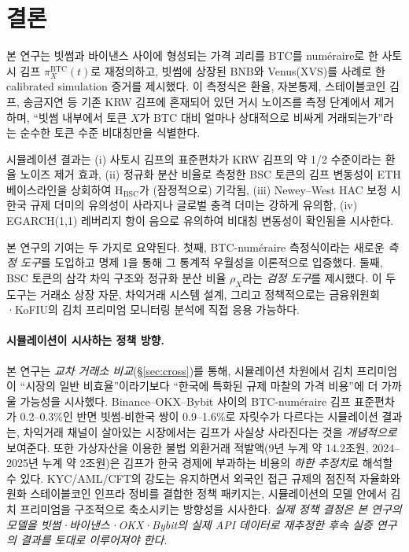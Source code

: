 \documentclass[11pt,a4paper]{article}
\begin{document}
\section{결론}

본 연구는 빗썸과 바이낸스 사이에 형성되는 가격 괴리를 BTC를 num\'eraire로 한 사토시 김프
$\pi^{\text{BTC}}_X(t)$로 재정의하고, 빗썸에 상장된 BNB와 Venus(XVS)를 사례로 한 calibrated
simulation 증거를 제시했다. 이 측정식은 환율, 자본통제, 스테이블코인 김프, 송금지연 등
기존 KRW 김프에 혼재되어 있던 거시 노이즈를 측정 단계에서 제거하며, ``빗썸 내부에서 토큰 $X$가
BTC 대비 얼마나 상대적으로 비싸게 거래되는가''라는 순수한 토큰 수준 비대칭만을 식별한다.

시뮬레이션 결과는 (i) 사토시 김프의 표준편차가 KRW 김프의 약 1/2 수준이라는 환율 노이즈 제거 효과,
(ii) 정규화 분산 비율로 측정한 BSC 토큰의 김프 변동성이 ETH 베이스라인을 상회하여
H$_{\text{BSC}}$가 (잠정적으로) 기각됨, (iii) Newey--West HAC 보정 시 한국 규제 더미의 유의성이
사라지나 글로벌 충격 더미는 강하게 유의함, (iv) EGARCH(1,1) 레버리지 항이 음으로 유의하여
비대칭 변동성이 확인됨을 시사한다.

본 연구의 기여는 두 가지로 요약된다. 첫째, BTC-num\'eraire 측정식이라는 새로운
\emph{측정 도구}를 도입하고 명제 1을 통해 그 통계적 우월성을 이론적으로 입증했다.
둘째, BSC 토큰의 삼각 차익 구조와 정규화 분산 비율 $\rho_X$라는 \emph{검정 도구}를 제시했다.
이 두 도구는 거래소 상장 자문, 차익거래 시스템 설계, 그리고 정책적으로는 금융위원회·KoFIU의
김치 프리미엄 모니터링 분석에 직접 응용 가능하다.

\paragraph{시뮬레이션이 시사하는 정책 방향.}
본 연구는 \emph{교차 거래소 비교}(\S\ref{sec:cross})를 통해, 시뮬레이션 차원에서
김치 프리미엄이 ``시장의 일반 비효율''이라기보다 ``한국에 특화된 규제 마찰의 가격 비용''에
더 가까울 가능성을 시사했다. Binance--OKX--Bybit 사이의 BTC-num\'eraire 김프 표준편차가
0.2--0.3\%인 반면 빗썸-비한국 쌍이 0.9--1.6\%로 자릿수가 다르다는 시뮬레이션 결과는,
차익거래 채널이 살아있는 시장에서는 김프가 사실상 사라진다는 것을 \emph{개념적으로}
보여준다. 또한 가상자산을 이용한 불법 외환거래 적발액(9년 누계 약 14.2조원,
2024--2025년 누계 약 2조원)은 김프가 한국 경제에 부과하는 비용의 \emph{하한 추정치}로
해석할 수 있다. KYC/AML/CFT의 강도는 유지하면서 외국인 접근 규제의 점진적 자율화와
원화 스테이블코인 인프라 정비를 결합한 정책 패키지는, 시뮬레이션의 모델 안에서
김치 프리미엄을 구조적으로 축소시키는 방향성을 시사한다. \emph{실제 정책 결정은
본 연구의 모델을 빗썸·바이낸스·OKX·Bybit의 실제 API 데이터로 재추정한 후속 실증
연구의 결과를 토대로 이루어져야 한다.}
\end{document}
